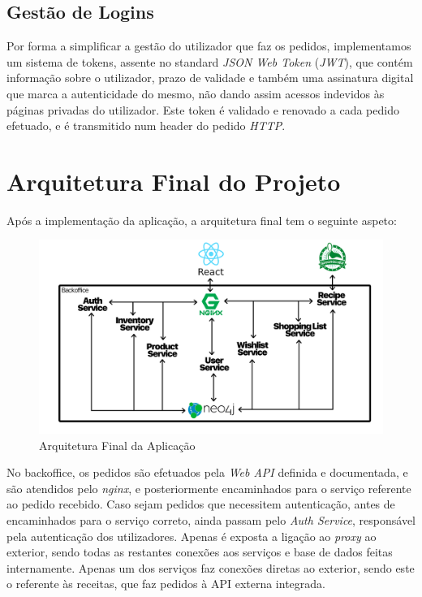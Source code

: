 \documentclass[a4paper]{report}
\begin{document}
    \section{Gestão de Logins}
    Por forma a simplificar a gestão do utilizador que faz os pedidos,
    implementamos um sistema de tokens, assente no standard \textit{JSON Web
    Token} (\textit{JWT}), que contém informação sobre o utilizador, prazo de
    validade e também uma assinatura digital que marca a autenticidade do mesmo,
    não dando assim acessos indevidos às páginas privadas do utilizador. Este
    token é validado e renovado a cada pedido efetuado, e é transmitido num
    header do pedido \textit{HTTP}.

\chapter{Arquitetura Final do Projeto}
Após a implementação da aplicação, a arquitetura final tem o seguinte aspeto:
\begin{figure}[H]
    \centering
        \includegraphics[width=\textwidth]{images/arquitetura.png}
        \caption{Arquitetura Final da Aplicação}
\end{figure}

No backoffice, os pedidos são efetuados pela \textit{Web API} definida e
documentada, e são atendidos pelo \textit{nginx}, e posteriormente 
encaminhados para o serviço referente ao pedido recebido. Caso sejam 
pedidos que necessitem autenticação, antes de encaminhados para o serviço 
correto, ainda passam pelo \textit{Auth Service}, responsável pela autenticação 
dos utilizadores. Apenas é exposta a ligação ao \textit{proxy} ao exterior,
sendo todas as restantes conexões aos serviços e base de dados feitas
internamente. Apenas um dos serviços faz conexões diretas ao exterior, sendo
este o referente às receitas, que faz pedidos à API externa integrada.
\end{document}
